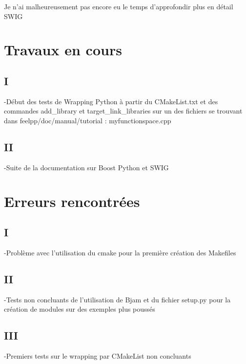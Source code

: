 \documentclass[12pt]{article}
\begin{document}
Je n'ai malheureusement pas encore eu le temps d'approfondir plus en détail SWIG

\section{Travaux en cours}

\subsection{I}
-Début des tests de Wrapping Python à partir du CMakeList.txt et des commandes
add\_library et target\_link\_libraries sur un des fichiers se trouvant dans feelpp/doc/manual/tutorial : myfunctionspace.cpp

\subsection{II}
-Suite de la documentation sur Boost Python et SWIG

\section{Erreurs rencontrées}

\subsection{I}
-Problème avec l'utilisation du cmake pour la première création des Makefiles

\subsection{II}
-Tests non concluants de l'utilisation de Bjam et du fichier setup.py pour la création de modules sur des exemples plus poussés

\subsection{III}
-Premiers tests sur le wrapping par CMakeList non concluants
\end{document}
